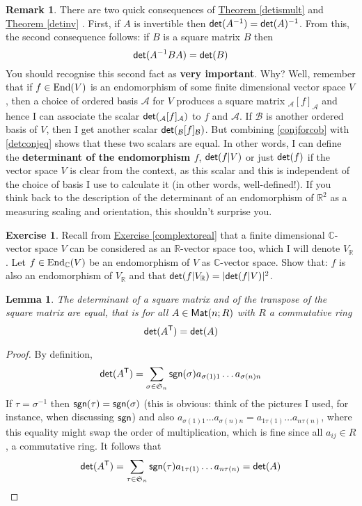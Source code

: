 \documentclass[11pt]{amsbook}
\newtheorem{lemma}[theorem]{Lemma}
\theoremstyle{definition}
\newtheorem{rem}[theorem]{Remark}
\newtheorem{exercise}{Exercise}
\begin{document}
\begin{rem} \label{detisinvariant}
There are two quick consequences of \hyperref[detismult]{Theorem \ref{detismult}} and \hyperref[detinv]{Theorem \ref{detinv}} . First, if $A$ is invertible then ${\sf det}(A^{-1}) = {\sf det}(A)^{-1}$. From this, the second consequence follows: if $B$ is a square matrix $B$ then \begin{equation} \label{detconjeq} {\sf det}( A^{-1}BA) = {\sf det}(B)\end{equation} You should recognise this second fact as {\bf very important}. Why? Well, remember that if $f\in {\rm End}(V)$ is an endomorphism of some finite dimensional vector space $V$, then a choice of ordered basis $\mathcal{A}$ for $V$ produces a square matrix ${}_{\mathcal{A}}[f]_{\mathcal{A}}$ and hence I can associate the scalar ${\sf det}({}_{\mathcal{A}}[f]_{\mathcal{A}})$ to $f$ and $\mathcal{A}$. If $\mathcal{B}$ is another ordered basis of $V$, then I get another scalar ${\sf det}({}_{\mathcal{B}}[f]_{\mathcal{B}})$. But combining \eqref{conjforcob} with \eqref{detconjeq} shows that these two scalars are equal. In other words, I can define the {\bf determinant of the endomorphism $f$}, ${\sf det}(f|V)$ or just ${\sf det}(f)$ if the vector space $V$ is clear from the context, as this scalar and this is independent of the choice of basis I use to calculate it (in other words, well-defined!). If you think back to the description of the determinant of an endomorphism of $\mathbb{R}^2$ as a measuring scaling and orientation, this shouldn't surprise you.
\end{rem}



\begin{exercise} Recall from \hyperref[complextoreal]{Exercise \ref{complextoreal}} that a finite dimensional $\mathbb{C}$-vector space $V$ can be considered as an $\mathbb{R}$-vector space too, which I will denote $V_{\mathbb{R}}$ . Let $f\in {\rm End}_{\mathbb{C}}(V)$ be an endomorphism of $V$ as $\mathbb{C}$-vector space. Show that: $f$ is also an endomorphism of $V_\mathbb{R}$ and that ${\sf det}(f|{V_{\mathbb{R}}})  = |{\sf det}(f|V)|^2$.
 \end{exercise}

\begin{lemma}\label{dettrans}
The determinant of a square matrix and of the transpose of the square matrix are equal, that is for all $A\in {\sf Mat}(n;R)$ with $R$ a commutative ring $${\sf det}(A^{\sf T}) = {\sf det}(A)$$
\end{lemma}
\begin{proof}
By definition, $${\sf det}(A^{\sf T}) = \sum_{\sigma\in\mathfrak{S}_n} {\sf sgn}(\sigma) a_{\sigma (1) 1} \ldots a_{\sigma(n)n}$$ If $\tau = \sigma^{-1}$ then ${\sf sgn}(\tau) = {\sf sgn}(\sigma)$ (this is obvious: think of the pictures I used, for instance, when discussing ${\sf sgn}$) and also $a_{\sigma (1) 1} \ldots a_{\sigma(n)n} = a_{1\tau (1)} \ldots a_{n\tau(n)}$, where this equality might swap the order of multiplication, which is fine since all $a_{ij}\in R$, a commutative ring. It follows that $${\sf det}(A^{\sf T}) = \sum_{\tau \in \mathfrak{S}_n} {\sf sgn}(\tau) a_{1\tau (1)} \ldots a_{n\tau(n)} = {\sf det}(A)$$
\end{proof}
\end{document}
